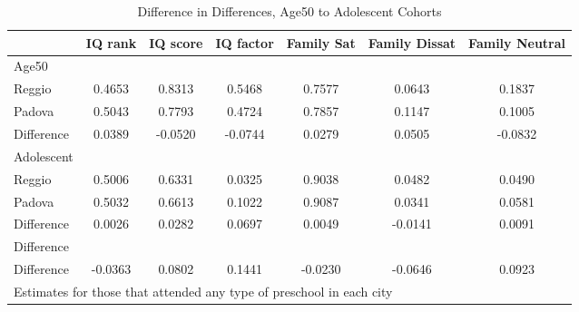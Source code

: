 \begin{table}[htbp]\centering
\caption{Difference in Differences, Age50 to Adolescent Cohorts}
\begin{tabular}{l*{6}{c}}
\hline\hline
            &     IQ rank&    IQ score&   IQ factor&  Family Sat&Family Dissat&Family Neutral\\
\hline
Age50       &            &            &            &            &            &            \\
Reggio      &      0.4653&      0.8313&      0.5468&      0.7577&      0.0643&      0.1837\\
Padova      &      0.5043&      0.7793&      0.4724&      0.7857&      0.1147&      0.1005\\
Difference  &      0.0389&     -0.0520&     -0.0744&      0.0279&      0.0505&     -0.0832\\
\hline
Adolescent  &            &            &            &            &            &            \\
Reggio      &      0.5006&      0.6331&      0.0325&      0.9038&      0.0482&      0.0490\\
Padova      &      0.5032&      0.6613&      0.1022&      0.9087&      0.0341&      0.0581\\
Difference  &      0.0026&      0.0282&      0.0697&      0.0049&     -0.0141&      0.0091\\
\hline
Difference  &            &            &            &            &            &            \\
Difference  &     -0.0363&      0.0802&      0.1441&     -0.0230&     -0.0646&      0.0923\\
\hline\hline
\multicolumn{7}{l}{\footnotesize Estimates for those that attended any type of preschool in each city}\\
\end{tabular}
\end{table}
